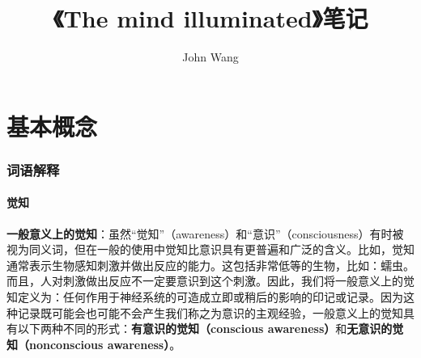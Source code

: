 \documentclass{ctexart}
\def\dfn#1{\textbf{#1}}
\def\dfnb#1#2{\textbf{#1（#2）}}
\begin{document}
    \title{《The mind illuminated》笔记}
    \author{John Wang}
    \maketitle
    \tableofcontents

\part{基本概念}
    \section{词语解释}
    \subsection{觉知}
    \dfn{一般意义上的觉知}：虽然“觉知”（awareness）和“意识”（consciousness）有时被视为同义词，但在一般的使用中觉知比意识具有更普遍和广泛的含义。比如，觉知通常表示生物感知刺激并做出反应的能力。这包括非常低等的生物，比如：蠕虫。而且，人对刺激做出反应不一定要意识到这个刺激。因此，我们将一般意义上的觉知定义为：任何作用于神经系统的可造成立即或稍后的影响的印记或记录。因为这种记录既可能会也可能不会产生我们称之为意识的主观经验，一般意义上的觉知具有以下两种不同的形式：\dfnb{有意识的觉知}{conscious awareness}和\dfnb{无意识的觉知}{nonconscious awareness}。
\end{document}
